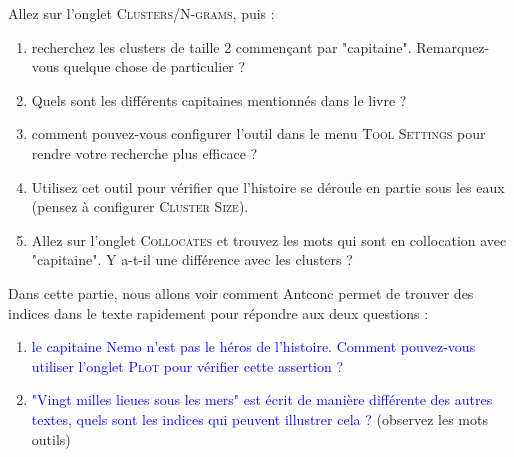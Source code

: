 Allez sur l'onglet \textsc{Clusters/N-grams}, puis :

\begin{enumerate}
    \item recherchez les clusters de taille 2 commençant par "capitaine". Remarquez-vous quelque chose de particulier ?
    \item Quels sont les différents capitaines mentionnés dans le livre ?
    \item comment pouvez-vous configurer l'outil dans le menu \textsc{Tool Settings} pour rendre votre recherche plus efficace ?
    \item Utilisez cet outil pour vérifier que l'histoire se déroule en partie sous les eaux (pensez à configurer \textsc{Cluster Size}).
    \item Allez sur l'onglet \textsc{Collocates} et trouvez les mots qui sont en collocation avec "capitaine". Y a-t-il une différence avec les clusters ?
\end{enumerate}
\vspace{.5cm}
\vspace{.5cm}

Dans cette partie, nous allons voir comment Antconc permet de trouver des indices dans le texte rapidement pour répondre aux deux questions :

\begin{enumerate}
	\item \textcolor{blue}{le capitaine Nemo n'est pas le héros de l'histoire. Comment pouvez-vous utiliser l'onglet \textsc{Plot} pour vérifier cette assertion ?}
	\item \textcolor{blue}{"Vingt milles lieues sous les mers" est écrit de manière différente des autres textes, quels sont les indices qui peuvent illustrer cela ?} (observez les mots outils)
\end{enumerate}
